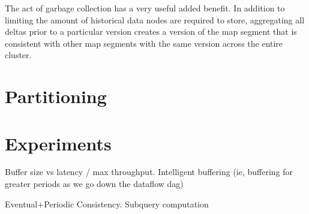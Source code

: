 \documentclass{vldb}
\begin{document}
The act of garbage collection has a very useful added benefit.  In addition to limiting the amount of historical data nodes are required to store, aggregating all deltas prior to a particular version creates a version of the map segment that is consistent with other map segments with the same version across the entire cluster.

\section{Partitioning}
\label{sec:partitioning}

\section{Experiments}

Buffer size vs latency / max throughput.  Intelligent buffering (ie, buffering for greater periods as we go down the dataflow dag)


Eventual+Periodic Consistency.
Subquery computation

{\small


}
\end{document}
